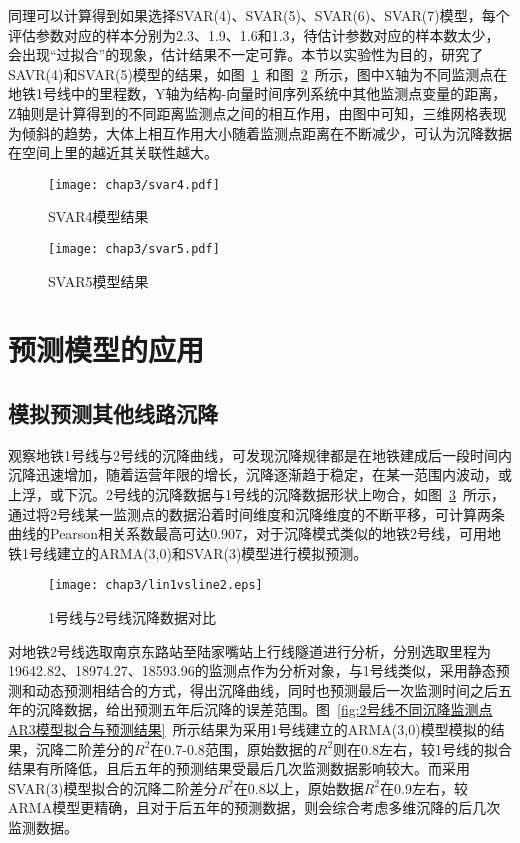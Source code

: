 同理可以计算得到如果选择SVAR(4)、SVAR(5)、SVAR(6)、SVAR(7)模型，每个评估参数对应的样本分别为2.3、1.9、1.6和1.3，待估计参数对应的样本数太少，会出现“过拟合”的现象，估计结果不一定可靠。本节以实验性为目的，研究了SAVR(4)和SVAR(5)模型的结果，如图~\ref{fig:SVAR4模型结果}~和图~\ref{fig:SVAR5模型结果}~所示，图中X轴为不同监测点在地铁1号线中的里程数，Y轴为结构-向量时间序列系统中其他监测点变量的距离，Z轴则是计算得到的不同距离监测点之间的相互作用，由图中可知，三维网格表现为倾斜的趋势，大体上相互作用大小随着监测点距离在不断减少，可认为沉降数据在空间上里的越近其关联性越大。

\begin{figure}[htb!]
    \centering
    \texttt{[image: chap3/svar4.pdf]}
    \caption{SVAR4模型结果}
    \label{fig:SVAR4模型结果}
\end{figure}

\begin{figure}[htb!]
    \centering
    \texttt{[image: chap3/svar5.pdf]}
    \caption{SVAR5模型结果}
    \label{fig:SVAR5模型结果}
\end{figure}

\section{预测模型的应用}

\subsection{模拟预测其他线路沉降}

观察地铁1号线与2号线的沉降曲线，可发现沉降规律都是在地铁建成后一段时间内沉降迅速增加，随着运营年限的增长，沉降逐渐趋于稳定，在某一范围内波动，或上浮，或下沉。2号线的沉降数据与1号线的沉降数据形状上吻合，如图~\ref{fig:1号线与2号线沉降数据对比}~所示，通过将2号线某一监测点的数据沿着时间维度和沉降维度的不断平移，可计算两条曲线的Pearson相关系数最高可达0.907，对于沉降模式类似的地铁2号线，可用地铁1号线建立的ARMA(3,0)和SVAR(3)模型进行模拟预测。

\begin{figure}[htb!]
    \centering
    \texttt{[image: chap3/lin1vsline2.eps]}
    \caption{1号线与2号线沉降数据对比}
    \label{fig:1号线与2号线沉降数据对比}
\end{figure}

对地铁2号线选取南京东路站至陆家嘴站上行线隧道进行分析，分别选取里程为19642.82、18974.27、18593.96的监测点作为分析对象，与1号线类似，采用静态预测和动态预测相结合的方式，得出沉降曲线，同时也预测最后一次监测时间之后五年的沉降数据，给出预测五年后沉降的误差范围。图~\ref{fig:2号线不同沉降监测点AR3模型拟合与预测结果}~所示结果为采用1号线建立的ARMA(3,0)模型模拟的结果，沉降二阶差分的$R^2$在0.7-0.8范围，原始数据的$R^2$则在0.8左右，较1号线的拟合结果有所降低，且后五年的预测结果受最后几次监测数据影响较大。而采用SVAR(3)模型拟合的沉降二阶差分$R^2$在0.8以上，原始数据$R^2$在0.9左右，较ARMA模型更精确，且对于后五年的预测数据，则会综合考虑多维沉降的后几次监测数据。

